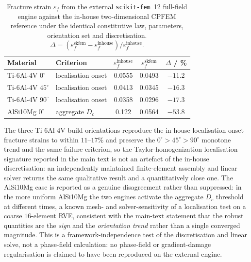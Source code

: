 \documentclass[11pt,a4paper,twocolumn]{article}
\providecommand{\ang}[1]{\ensuremath{#1^{\circ}}}
\begin{document}
\begin{table}[tp]
\centering
\caption{Fracture strain $\varepsilon_f$ from the external \texttt{scikit-fem}~12 full-field engine against
the in-house two-dimensional CPFEM reference under the identical constitutive law, parameters, orientation
set and discretisation. $\Delta = (\varepsilon_f^{\mathrm{skfem}}-\varepsilon_f^{\mathrm{inhouse}})/\varepsilon_f^{\mathrm{inhouse}}$.}
\label{tab:si_skfem}
\footnotesize
\begin{tabular}{llccc}
\toprule
\textbf{Material} & \textbf{Criterion} & $\varepsilon_f^{\mathrm{inhouse}}$ & $\varepsilon_f^{\mathrm{skfem}}$ & $\Delta$ / \% \\
\midrule
Ti-6Al-4V $\ang{0}$  & localisation onset & 0.0555 & 0.0493 & $-11.2$ \\
Ti-6Al-4V $\ang{45}$ & localisation onset & 0.0413 & 0.0345 & $-16.3$ \\
Ti-6Al-4V $\ang{90}$ & localisation onset & 0.0358 & 0.0296 & $-17.3$ \\
AlSi10Mg $\ang{0}$   & aggregate $D_c$ & 0.122 & 0.0564 & $-53.8$ \\
\bottomrule
\end{tabular}
\end{table}

The three Ti-6Al-4V build orientations reproduce the in-house localisation-onset fracture strains to within
$11$--$17\%$ and preserve the $\ang{0}>\ang{45}>\ang{90}$ monotone trend and the same failure criterion, so
the Taylor-homogenization localisation signature reported in the main text is not an artefact of the
in-house discretisation: an independently maintained finite-element assembly and linear solver returns the
same qualitative result and a quantitatively close one. The AlSi10Mg case is reported as a genuine
disagreement rather than suppressed: in the more uniform AlSi10Mg the two engines activate the aggregate
$D_c$ threshold at different times, a known mesh- and solver-sensitivity of a localisation test on a coarse
$16$-element RVE, consistent with the main-text statement that the robust quantities are the \emph{sign} and
the \emph{orientation trend} rather than a single converged magnitude. This is a framework-independence test
of the discretisation and linear solve, not a phase-field calculation: no phase-field or gradient-damage
regularisation is claimed to have been reproduced on the external engine.
\end{document}
